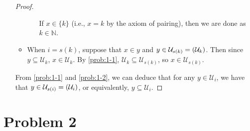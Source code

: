 \documentclass[a4paper]{article}
\newcommand{\N}{\mathbb{N}}
\let\P\relax
\newcommand{\P}{\mathcal{P}}
\newcommand{\U}{\mathcal{U}}
\begin{document}
\begin{enumerate}
\begin{proof}
\begin{itemize}
\begin{itemize}
        If $x \in \{k\}$ (i.e., $x = k$ by the axiom of pairing), then we are done as $k \in \N$.
      \end{itemize}
    \item When $i = s(k)$, suppose that $x \in y$ and $y \in \U_{s(k)} = \P(\U_{k})$.
      Then since $y \subseteq \U_{k}$, $x \in \U_{k}$.
      By \ref{prob:1-1}, $\U_{k} \subseteq \U_{s(k)}$, so $x \in \U_{s(k)}$.
    \end{itemize}
    From \ref{prob:1-1} and \ref{prob:1-2}, we can deduce that for any $y \in \U_{i}$, we have that $y \in \U_{s(i)} = \P(\U_{i})$, or equivalently, $y \subseteq \U_{i}$.
  \end{proof}
\end{enumerate}

\section*{Problem 2}
\end{document}
